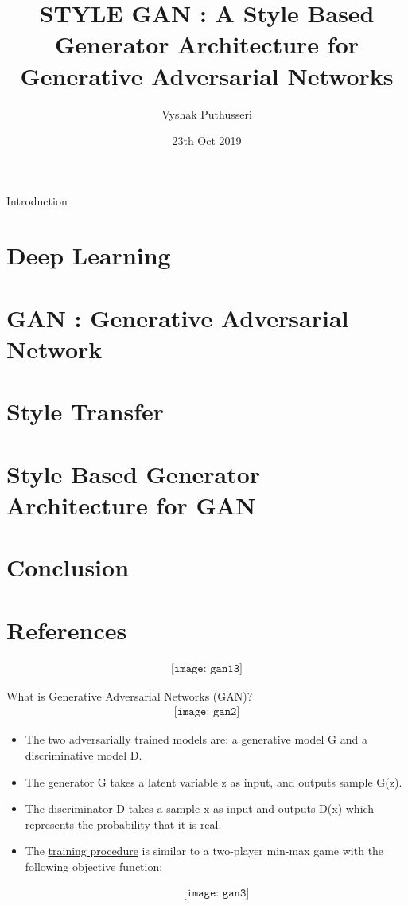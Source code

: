 \documentclass{beamer}
\author{Vyshak Puthusseri}
\date{23th Oct 2019}
\institute[CET]
{
College of Engineering, Trivandrum\\\\
\text{TVE17MCA054}
}
\title{STYLE GAN : A Style Based Generator Architecture for Generative Adversarial Networks}
\begin{document}
\titlepage 
\begin{frame}
    {Introduction}
    \tableofcontents   
\end{frame}

\section{Deep Learning}
\section{GAN : Generative Adversarial Network}
\section{Style Transfer}
\section{Style Based Generator Architecture for GAN}
\section{Conclusion}
\section{References}







\begin{frame}
  \begin{align*}
    \texttt{[image: gan13]}  
\end{align*}  
\end{frame}
\begin{frame}{What is Generative Adversarial Networks (GAN)?}   
\begin{align*}
    \texttt{[image: gan2]}  
\end{align*}
\end{frame}
\begin{frame}   
\begin{itemize}
\item The two adversarially trained models are: a generative
model G and a discriminative model D.
\item The generator G takes a latent variable z as input, and outputs sample G(z).
\item The discriminator D takes a sample x as input and outputs
D(x) which represents the probability that it is real.
\item The \underline{training procedure} is similar to a two-player min-max game
with the following objective function:

\begin{align*}
    \texttt{[image: gan3]}  
\end{align*}
\end{itemize}

\end{frame}
\end{document}
